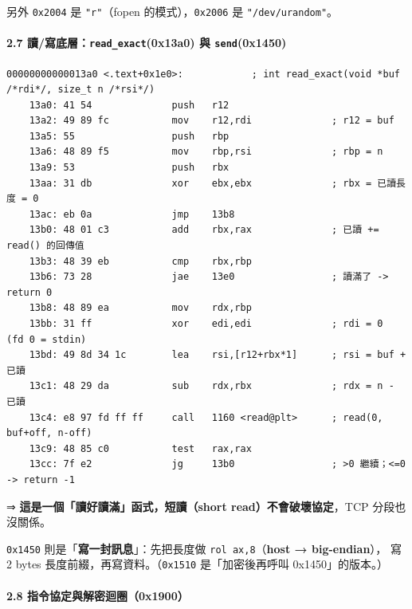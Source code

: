 \documentclass[10pt,a4paper]{article}
\begin{document}
另外 \texttt{0x2004} 是 \texttt{"r"}（fopen 的模式），\texttt{0x2006} 是
\texttt{"/\allowbreak{}dev/\allowbreak{}urandom"}。

\paragraph{\texorpdfstring{2.7 讀/寫底層：\texttt{read\_\allowbreak{}exact}(0x13a0)
與
\texttt{send}(0x1450)}{2.7 讀/寫底層：read\_exact(0x13a0) 與 send(0x1450)}}\label{ux8b80ux5bebux5e95ux5c64read_exact0x13a0-ux8207-send0x1450}

\begin{Verbatim}[breaklines=true,breakanywhere=true,breakautoindent=false,fontsize=\fontsize{7.0}{9.5}\selectfont]
00000000000013a0 <.text+0x1e0>:            ; int read_exact(void *buf /*rdi*/, size_t n /*rsi*/)
    13a0: 41 54              push   r12
    13a2: 49 89 fc           mov    r12,rdi              ; r12 = buf
    13a5: 55                 push   rbp
    13a6: 48 89 f5           mov    rbp,rsi              ; rbp = n
    13a9: 53                 push   rbx
    13aa: 31 db              xor    ebx,ebx              ; rbx = 已讀長度 = 0
    13ac: eb 0a              jmp    13b8
    13b0: 48 01 c3           add    rbx,rax              ; 已讀 += read() 的回傳值
    13b3: 48 39 eb           cmp    rbx,rbp
    13b6: 73 28              jae    13e0                 ; 讀滿了 -> return 0
    13b8: 48 89 ea           mov    rdx,rbp
    13bb: 31 ff              xor    edi,edi              ; rdi = 0  (fd 0 = stdin)
    13bd: 49 8d 34 1c        lea    rsi,[r12+rbx*1]      ; rsi = buf + 已讀
    13c1: 48 29 da           sub    rdx,rbx              ; rdx = n - 已讀
    13c4: e8 97 fd ff ff     call   1160 <read@plt>      ; read(0, buf+off, n-off)
    13c9: 48 85 c0           test   rax,rax
    13cc: 7f e2              jg     13b0                 ; >0 繼續；<=0 -> return -1
\end{Verbatim}

⇒ \textbf{這是一個「讀好讀滿」函式，短讀（short read）不會破壞協定}，TCP
分段也沒關係。

\texttt{0x1450} 則是「\textbf{寫一封訊息}」：先把長度做
\texttt{rol\ \allowbreak{}ax,\allowbreak{}8}（\textbf{host → big-endian}）， 寫 2 bytes
長度前綴，再寫資料。（\texttt{0x1510} 是「加密後再呼叫
0x1450」的版本。）

\paragraph{2.8
指令協定與解密迴圈（0x1900）}\label{ux6307ux4ee4ux5354ux5b9aux8207ux89e3ux5bc6ux8ff4ux57080x1900}
\end{document}
